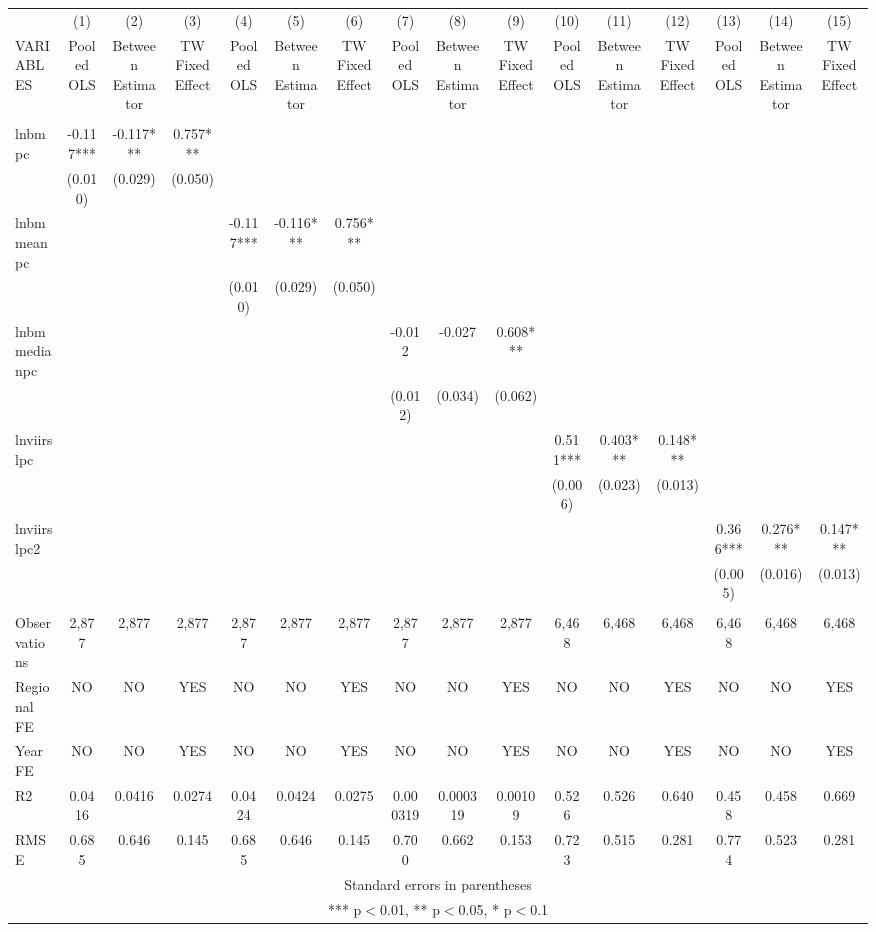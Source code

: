 \documentclass[]{article}
\begin{document}
\begin{tabular}{lccccccccccccccc} \hline
 & (1) & (2) & (3) & (4) & (5) & (6) & (7) & (8) & (9) & (10) & (11) & (12) & (13) & (14) & (15) \\
VARIABLES & Pooled OLS & Between Estimator & TW Fixed Effect & Pooled OLS & Between Estimator & TW Fixed Effect & Pooled OLS & Between Estimator & TW Fixed Effect & Pooled OLS & Between Estimator & TW Fixed Effect & Pooled OLS & Between Estimator & TW Fixed Effect \\ \hline
 &  &  &  &  &  &  &  &  &  &  &  &  &  &  &  \\
lnbmpc & -0.117*** & -0.117*** & 0.757*** &  &  &  &  &  &  &  &  &  &  &  &  \\
 & (0.010) & (0.029) & (0.050) &  &  &  &  &  &  &  &  &  &  &  &  \\
lnbmmeanpc &  &  &  & -0.117*** & -0.116*** & 0.756*** &  &  &  &  &  &  &  &  &  \\
 &  &  &  & (0.010) & (0.029) & (0.050) &  &  &  &  &  &  &  &  &  \\
lnbmmedianpc &  &  &  &  &  &  & -0.012 & -0.027 & 0.608*** &  &  &  &  &  &  \\
 &  &  &  &  &  &  & (0.012) & (0.034) & (0.062) &  &  &  &  &  &  \\
lnviirslpc &  &  &  &  &  &  &  &  &  & 0.511*** & 0.403*** & 0.148*** &  &  &  \\
 &  &  &  &  &  &  &  &  &  & (0.006) & (0.023) & (0.013) &  &  &  \\
lnviirslpc2 &  &  &  &  &  &  &  &  &  &  &  &  & 0.366*** & 0.276*** & 0.147*** \\
 &  &  &  &  &  &  &  &  &  &  &  &  & (0.005) & (0.016) & (0.013) \\
 &  &  &  &  &  &  &  &  &  &  &  &  &  &  &  \\
Observations & 2,877 & 2,877 & 2,877 & 2,877 & 2,877 & 2,877 & 2,877 & 2,877 & 2,877 & 6,468 & 6,468 & 6,468 & 6,468 & 6,468 & 6,468 \\
Regional FE & NO & NO & YES & NO & NO & YES & NO & NO & YES & NO & NO & YES & NO & NO & YES \\
Year FE & NO & NO & YES & NO & NO & YES & NO & NO & YES & NO & NO & YES & NO & NO & YES \\
R2 & 0.0416 & 0.0416 & 0.0274 & 0.0424 & 0.0424 & 0.0275 & 0.000319 & 0.000319 & 0.00109 & 0.526 & 0.526 & 0.640 & 0.458 & 0.458 & 0.669 \\
 RMSE & 0.685 & 0.646 & 0.145 & 0.685 & 0.646 & 0.145 & 0.700 & 0.662 & 0.153 & 0.723 & 0.515 & 0.281 & 0.774 & 0.523 & 0.281 \\ \hline
\multicolumn{16}{c}{ Standard errors in parentheses} \\
\multicolumn{16}{c}{ *** p$<$0.01, ** p$<$0.05, * p$<$0.1} \\
\end{tabular}
\end{document}

